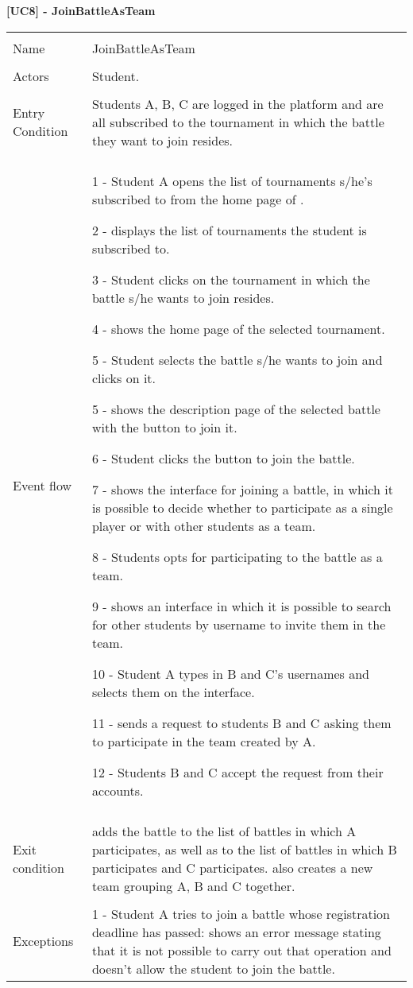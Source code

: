    
	\textbf{[UC8] - JoinBattleAsTeam}
	
	\begin{longtable}{p{3cm}p{14cm}}
		\hline\\
		Name & JoinBattleAsTeam \\
		\hline\\
		Actors & Student. \\
		\hline\\
		Entry Condition & Students A, B, C are logged in the platform and are all subscribed to the tournament in which the battle they want to join resides.\\
		\hline\\
		Event flow &  
		1 - Student A opens the list of tournaments s/he's subscribed to from the home page of \app.
		
		2 - \app displays the list of tournaments the student is subscribed to.
		
		3 - Student clicks on the tournament in which the battle s/he wants to join resides.
		
		4 - \app shows the home page of the selected tournament.
		
		5 - Student selects the battle s/he wants to join and clicks on it.
		
		5 - \app shows the description page of the selected battle with the button to join it.
		
		6 - Student clicks the button to join the battle.
		
		7 - \app shows the interface for joining a battle, in which it is possible to decide whether to participate as a single player or with other students as a team.
		
		8 - Students opts for participating to the battle as a team.
		
		9 - \app shows an interface in which it is possible to search for other students by username to invite them in the team.
		
		10 - Student A types in B and C's usernames and selects them on the interface.
		
		11 - \app sends a request to students B and C asking them to participate in the team created by A.
		
		12 - Students B and C accept the request from their accounts.
		
		\\
		\hline\\
		Exit condition & \app adds the battle to the list of battles in which A participates, as well as to the list of battles in which B participates and C participates. \app also creates a new team grouping A, B and C together.\\
		\hline\\
		Exceptions & 
		1 - Student A tries to join a battle whose registration deadline has passed: \app shows an error message stating that it is not possible to carry out that operation and doesn't allow the student to join the battle.
		

\end{longtable}
